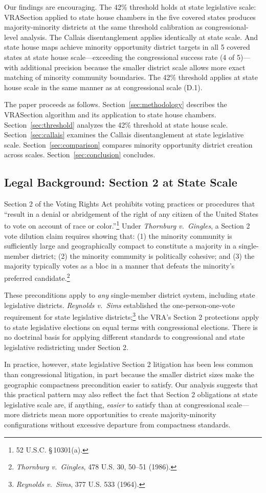 Our findings are encouraging. The 42\% threshold holds at state legislative scale: VRASection applied to state house chambers in the five covered states produces majority-minority districts at the same threshold calibration as congressional-level analysis. The Callais disentanglement applies identically at state scale. And state house maps achieve minority opportunity district targets in all 5 covered states at state house scale---exceeding the congressional success rate (4 of 5)---with additional precision because the smaller district scale allows more exact matching of minority community boundaries. The 42\% threshold applies at state house scale in the same manner as at congressional scale (D.1).

The paper proceeds as follows. Section~\ref{sec:methodology} describes the VRASection algorithm and its application to state house chambers. Section~\ref{sec:threshold} analyzes the 42\% threshold at state house scale. Section~\ref{sec:callais} examines the Callais disentanglement at state legislative scale. Section~\ref{sec:comparison} compares minority opportunity district creation across scales. Section~\ref{sec:conclusion} concludes.

\subsection{Legal Background: Section 2 at State Scale}

Section 2 of the Voting Rights Act prohibits voting practices or procedures that ``result in a denial or abridgement of the right of any citizen of the United States to vote on account of race or color.''\footnote{52 U.S.C. \S\,10301(a).} Under \textit{Thornburg v.\ Gingles}, a Section 2 vote dilution claim requires showing that: (1) the minority community is sufficiently large and geographically compact to constitute a majority in a single-member district; (2) the minority community is politically cohesive; and (3) the majority typically votes as a bloc in a manner that defeats the minority's preferred candidate.\footnote{\textit{Thornburg v.\ Gingles}, 478 U.S. 30, 50--51 (1986).}

These preconditions apply to \textit{any} single-member district system, including state legislative districts. \textit{Reynolds v.\ Sims} established the one-person-one-vote requirement for state legislative districts;\footnote{\textit{Reynolds v.\ Sims}, 377 U.S. 533 (1964).} the VRA's Section 2 protections apply to state legislative elections on equal terms with congressional elections. There is no doctrinal basis for applying different standards to congressional and state legislative redistricting under Section 2.

In practice, however, state legislative Section 2 litigation has been less common than congressional litigation, in part because the smaller district sizes make the geographic compactness precondition easier to satisfy. Our analysis suggests that this practical pattern may also reflect the fact that Section 2 obligations at state legislative scale are, if anything, \textit{easier} to satisfy than at congressional scale---more districts mean more opportunities to create majority-minority configurations without excessive departure from compactness standards.
